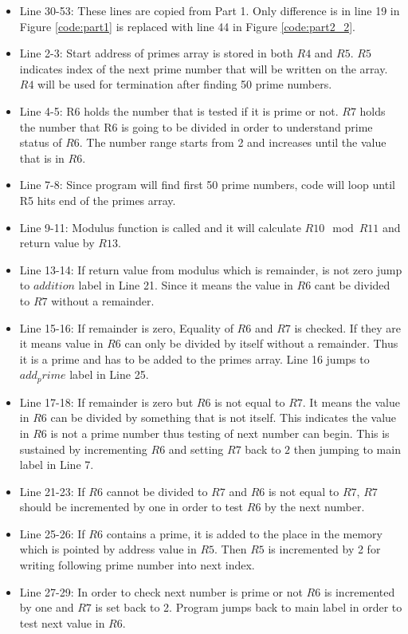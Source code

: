 \documentclass[pdftex,12pt,a4paper]{article}
\begin{document}
\begin{itemize}
    \item Line 30-53: These lines are copied from Part 1. Only difference is in line 19 in Figure \ref{code:part1} is replaced with line 44 in Figure \ref{code:part2_2}.
    \item Line 2-3: Start address of primes array is stored in both $R4$ and $R5$. $R5$ indicates index of the next prime number that will be written on the array. $R4$ will be used for termination after finding 50 prime numbers.
    \item Line 4-5: R6 holds the number that is tested if it is prime or not. $R7$ holds the number that R6 is going to be divided in order to understand prime status of $R6$. The number range starts from 2 and increases until the value that is in $R6$.
    \item Line 7-8: Since program will find first 50 prime numbers, code will loop until R5 hits end of the primes array.
    \item Line 9-11: Modulus function is called and it will calculate $R10 \mod R11$ and return value by $R13$. \item Line 13-14: If return value from modulus which is remainder, is not zero jump to $addition$ label in Line 21. Since it means the value in $R6$ cant be divided to $R7$ without a remainder.
    \item Line 15-16: If remainder is zero, Equality of $R6$ and $R7$ is checked. If they are it means value in $R6$ can only be divided by itself without a remainder. Thus it is a prime and has to be added to the primes array. Line 16 jumps to $add_prime$ label in Line 25.
    \item Line 17-18: If remainder is zero but $R6$ is not equal to $R7$. It means the value in $R6$ can be divided by something that is not itself. This indicates the value in $R6$ is not a prime number thus testing of next number can begin. This is sustained by incrementing $R6$ and setting $R7$ back to $2$ then jumping to main label in Line 7.
    \item Line 21-23: If $R6$ cannot be divided to $R7$ and $R6$ is not equal to $R7$, $R7$ should be incremented by one in order to test $R6$ by the next number.
    \item Line 25-26: If $R6$ contains a prime, it is added to the place in the memory which is pointed by address value in $R5$. Then $R5$ is incremented by 2 for writing following prime number into next index.
    \item Line 27-29: In order to check next number is prime or not $R6$ is incremented by one and $R7$ is set back to 2. Program jumps back to main label in order to test next value in $R6$.
    
\end{itemize}
\end{document}
